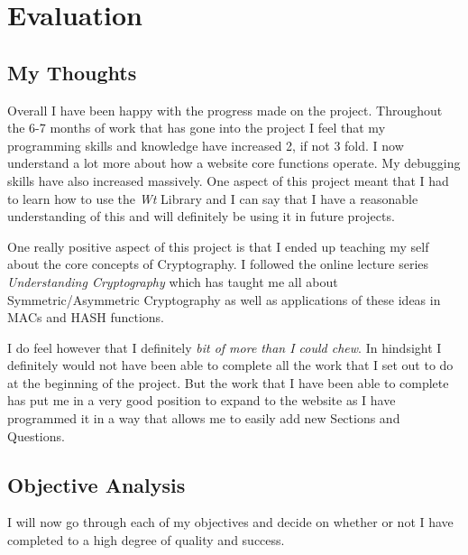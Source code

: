 %
%

\newpage
\chapter{Evaluation}

\section{My Thoughts}

Overall I have been happy with the progress made on the project. Throughout the 6-7 months of work that has gone into the project I feel that my programming skills and knowledge have increased 2, if not 3 fold. I now understand a lot more about how a website core functions operate. My debugging skills have also increased massively. One aspect of this project meant that I had to learn how to use the \textit{Wt} Library and I can say that I have a reasonable understanding of this and will definitely be using it in future projects.

One really positive aspect of this project is that I ended up teaching my self about the core concepts of Cryptography. I followed the online lecture series \textit{Understanding Cryptography} which has taught me all about Symmetric/Asymmetric Cryptography as well as applications of these ideas in MACs and HASH functions.

I do feel however that I definitely \textit{bit of more than I could chew}. In hindsight I definitely would not have been able to complete all the work that I set out to do at the beginning of the project. But the work that I have been able to complete has put me in a very good position to expand to the website as I have programmed it in a way that allows me to easily add new Sections and Questions.



\section{Objective Analysis}

I will now go through each of my objectives and decide on whether or not I have completed to a high degree of quality and success.

\newpage
